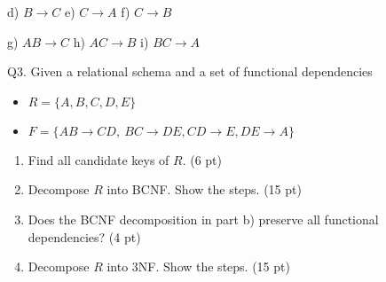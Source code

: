 \documentclass[
]{article}
\begin{document}
d) \(B \rightarrow C\) e) \(C \rightarrow A\) f) \(C \rightarrow B\)

g) \(AB \rightarrow C\) h) \(AC \rightarrow B\) i) \(BC \rightarrow A\)

Q3. Given a relational schema and a set of functional dependencies

\begin{itemize}
\item
  \(R = \{ A,B,C,D,E\}\)
\item
  \(F = \{ AB \rightarrow CD,\ BC \rightarrow DE,CD \rightarrow E,DE \rightarrow A\}\)
\end{itemize}

\begin{enumerate}
\def\labelenumi{\alph{enumi})}
\item
  Find all candidate keys of \(R\). (6 pt)
\item
  Decompose \(R\) into BCNF. Show the steps. (15 pt)
\item
  Does the BCNF decomposition in part b) preserve all functional
  dependencies? (4 pt)
\item
  Decompose \(R\) into 3NF. Show the steps. (15 pt)
\end{enumerate}
\end{document}

